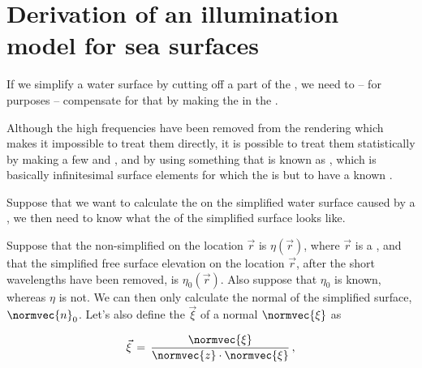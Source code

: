 \chapter{Derivation of an illumination model for sea surfaces}
\label{chap:illumination_model_derivation}

{



\HRule

If we simplify a water surface by cutting off a part of the , we need to -- for \rendering purposes -- compensate for that by making the  in the  .

Although the high frequencies have been removed from the rendering which makes it impossible to treat them directly, it is possible to treat them statistically by making a few \assumptions and \approximations, and by using something that is known as \microfacets, which is basically infinitesimal surface elements for which the  is \stochastic but \assumed to have a known .

\HRule

Suppose that we want to calculate the \shading on the simplified water surface caused by a , we then need to know what the  of the simplified surface looks like.

Suppose that the non-simplified  on the location $\vec{r}$ is $\eta(\vec{r})$, where $\vec{r}$ is a , and that the simplified free surface elevation on the location $\vec{r}$, after the short wavelengths have been removed, is $\eta_0(\vec{r})$. Also suppose that $\eta_0$ is known, whereas $\eta$ is not. We can then only calculate the normal of the simplified surface, $\normvec{n}_0$. Let's also define the  $\vec{\xi}$ of a normal $\normvec{\xi}$ as

\begin{equation}
\vec{\xi} \,=\, \frac{\normvec{\xi}}{\normvec{z}\cdot\normvec{\xi}}\,,
\end{equation}

}
